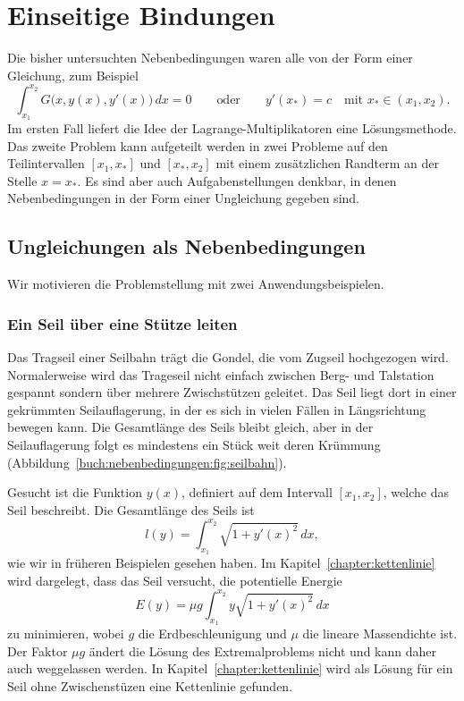 %
%
%
\section{Einseitige Bindungen
\label{buch:nebenbedingungen:section:einseitigebindungen}}
Die bisher untersuchten Nebenbedingungen waren alle von der
Form einer Gleichung, zum Beispiel 
\[
\int_{x_1}^{x_2} G\bigl(x,y(x),y'(x)\bigr)\,dx = 0
\qquad\text{oder}\qquad
y'(x_*) = c \quad\text{mit $x_*\in (x_1,x_2)$.}
\]
Im ersten Fall liefert die Idee der Lagrange-Multiplikatoren
eine Lösungsmethode.
Das zweite Problem kann aufgeteilt werden in zwei Probleme auf
den Teilintervallen $[x_1,x_*]$ und $[x_*,x_2]$ mit einem zusätzlichen
Randterm an der Stelle $x=x_*$.
Es sind aber auch Aufgabenstellungen denkbar, in denen Nebenbedingungen
in der Form einer Ungleichung gegeben sind.

%
%
\subsection{Ungleichungen als Nebenbedingungen
\label{buch:nebenbedingungen:einseitig:subsection:ungleichungen}}
Wir motivieren die Problemstellung mit zwei Anwendungsbeispielen.

%
%
\subsubsection{Ein Seil über eine Stütze leiten}

%
%
Das Tragseil einer Seilbahn trägt die Gondel, die vom Zugseil
hochgezogen wird.
%
Normalerweise wird das Trageseil nicht einfach zwischen Berg- und Talstation
gespannt sondern über mehrere Zwischstützen geleitet.
Das Seil liegt dort in einer gekrümmten Seilauflagerung, in der es sich
in vielen Fällen in Längsrichtung bewegen kann.
Die Gesamtlänge des Seils bleibt gleich, aber in der Seilauflagerung
%
folgt es mindestens ein Stück weit deren Krümmung
(Abbildung~\ref{buch:nebenbedingungen:fig:seilbahn}).

Gesucht ist die Funktion $y(x)$, definiert auf dem Intervall $[x_1,x_2]$,
welche das Seil beschreibt.
Die Gesamtlänge des Seils ist 
\[
l(y) = \int_{x_1}^{x_2} \sqrt{1+y'(x)^2}\,dx,
\]
wie wir in früheren Beispielen gesehen haben.
Im Kapitel~\ref{chapter:kettenlinie} wird dargelegt, dass das Seil
versucht, die potentielle Energie
\begin{equation}
E(y) = \mu g \int_{x_1}^{x_2} y\sqrt{1+y'(x)^2}\,dx
\label{buch:nebenbedingungen:einseitig:eqn:seilE}
\end{equation}
zu minimieren, wobei $g$ die Erdbeschleunigung und $\mu$ die
lineare Massendichte ist.
Der Faktor $\mu g$ ändert die Lösung des Extremalproblems nicht und 
kann daher auch weggelassen werden.
In Kapitel~\ref{chapter:kettenlinie} wird als Lösung für ein Seil
ohne Zwischenstüzen eine Kettenlinie gefunden.


